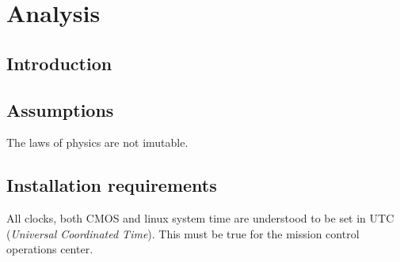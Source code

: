 \chapter{Analysis}

\section{Introduction}

\section{Assumptions}
The laws of physics are not imutable.

\section{Installation requirements}
All clocks, both CMOS and linux system time are understood to be set in UTC
 ({\em Universal Coordinated Time}). This must be true for the mission control operations center.
